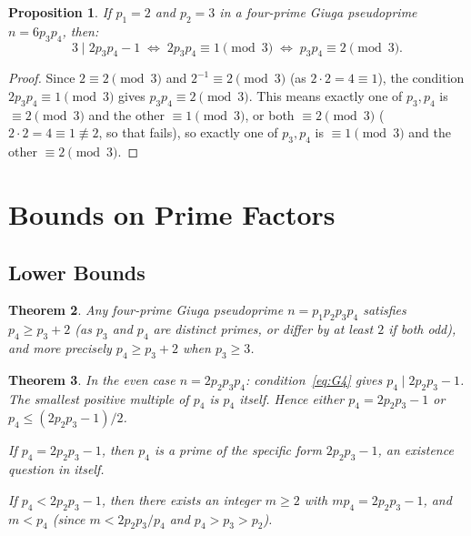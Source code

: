 \documentclass[12pt,a4paper]{amsart}
\newtheorem{theorem}{Theorem}[section]
\newtheorem{proposition}[theorem]{Proposition}
\theoremstyle{definition}
\begin{document}
\begin{proposition}
\label{prop:mod3}
If $p_1 = 2$ and $p_2 = 3$ in a four-prime Giuga pseudoprime $n = 6 p_3 p_4$,
then:
\[
  3 \mid 2 p_3 p_4 - 1 \;\Longleftrightarrow\; 2 p_3 p_4 \equiv 1 \pmod{3}
  \;\Longleftrightarrow\; p_3 p_4 \equiv 2 \pmod{3}.
\]
\end{proposition}

\begin{proof}
Since $2 \equiv 2 \pmod 3$ and $2^{-1} \equiv 2 \pmod 3$ (as $2 \cdot 2 = 4
\equiv 1$), the condition $2 p_3 p_4 \equiv 1 \pmod 3$ gives
$p_3 p_4 \equiv 2 \pmod 3$.  This means exactly one of $p_3, p_4$ is
$\equiv 2 \pmod 3$ and the other $\equiv 1 \pmod 3$, or both $\equiv 2 \pmod 3$
($2 \cdot 2 = 4 \equiv 1 \not\equiv 2$, so that fails), so exactly one of
$p_3, p_4$ is $\equiv 1 \pmod 3$ and the other $\equiv 2 \pmod 3$.
\end{proof}

\section{Bounds on Prime Factors}
\label{sec:bounds}

\subsection{Lower Bounds}

\begin{theorem}
\label{thm:lowerbound}
Any four-prime Giuga pseudoprime $n = p_1 p_2 p_3 p_4$ satisfies
$p_4 \ge p_3 + 2$ (as $p_3$ and $p_4$ are distinct primes, or differ by at
least $2$ if both odd), and more precisely $p_4 \ge p_3 + 2$ when $p_3 \ge 3$.
\end{theorem}

\begin{theorem}
\label{thm:p4lower}
In the even case $n = 2 p_2 p_3 p_4$: condition~\eqref{eq:G4} gives
$p_4 \mid 2 p_2 p_3 - 1$.  The smallest positive multiple of $p_4$ is $p_4$
itself.  Hence either $p_4 = 2 p_2 p_3 - 1$ or $p_4 \le (2 p_2 p_3 - 1)/2$.

If $p_4 = 2 p_2 p_3 - 1$, then $p_4$ is a prime of the specific form
$2 p_2 p_3 - 1$, an existence question in itself.

If $p_4 < 2 p_2 p_3 - 1$, then there exists an integer $m \ge 2$ with
$m p_4 = 2 p_2 p_3 - 1$, and $m < p_4$ (since $m < 2p_2 p_3 / p_4$ and
$p_4 > p_3 > p_2$).
\end{theorem}
\end{document}
